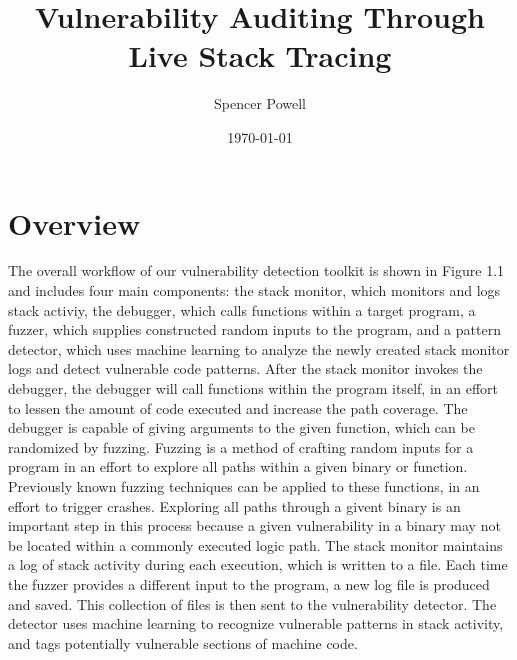 \documentclass{article}
\title{Vulnerability Auditing Through Live Stack Tracing}
\author{Spencer Powell}
\date{\today}
\begin{document}
\maketitle

\section {Overview}



The overall workflow of our vulnerability detection toolkit is shown in
Figure 1.1 and includes four main components: the stack monitor, which monitors and logs stack activiy, the debugger,
which calls functions within a target program, a fuzzer, which supplies constructed random inputs to the program, and a
pattern detector, which uses machine learning to analyze the newly created stack monitor logs and detect vulnerable code
patterns. After the stack monitor invokes the debugger, the debugger will call functions within the program itself, in
an effort to lessen the amount of code executed and increase the path coverage. The debugger is capable of giving
arguments to the given function, which can be randomized by fuzzing. Fuzzing is a method of crafting random inputs for a
program in an effort to explore all paths within a given binary or function. Previously known fuzzing techniques can be
applied to these functions, in an effort to trigger crashes. Exploring all paths through a givent binary is an important
step in this process because a given vulnerability in a binary may not be located within a commonly executed logic path.
The stack monitor maintains a log of stack activity during each execution, which is written to a file. Each time the
fuzzer provides a different input to the program, a new log file is produced and saved. This collection of files is then
sent to the vulnerability detector. The detector uses machine learning to recognize vulnerable patterns in stack
activity, and tags potentially vulnerable sections of machine code.
\end{document}
